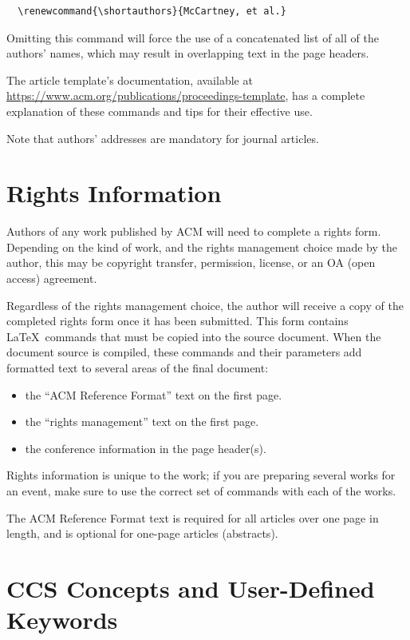 \documentclass[manuscript,screen]{acmart}
\providecommand{\tightlist}{%
  \setlength{\itemsep}{0pt}\setlength{\parskip}{0pt}}\usepackage{longtable,booktabs,array}
\begin{document}
\begin{verbatim}
  \renewcommand{\shortauthors}{McCartney, et al.}
\end{verbatim}

Omitting this command will force the use of a concatenated list of all
of the authors' names, which may result in overlapping text in the page
headers.

The article template's documentation, available at
\url{https://www.acm.org/publications/proceedings-template}, has a
complete explanation of these commands and tips for their effective use.

Note that authors' addresses are mandatory for journal articles.

\hypertarget{rights-information}{%
\section{Rights Information}\label{rights-information}}

Authors of any work published by ACM will need to complete a rights
form. Depending on the kind of work, and the rights management choice
made by the author, this may be copyright transfer, permission, license,
or an OA (open access) agreement.

Regardless of the rights management choice, the author will receive a
copy of the completed rights form once it has been submitted. This form
contains \LaTeX~commands that must be copied into the source document.
When the document source is compiled, these commands and their
parameters add formatted text to several areas of the final document:

\begin{itemize}
\tightlist
\item
  the ``ACM Reference Format'' text on the first page.
\item
  the ``rights management'' text on the first page.
\item
  the conference information in the page header(s).
\end{itemize}

Rights information is unique to the work; if you are preparing several
works for an event, make sure to use the correct set of commands with
each of the works.

The ACM Reference Format text is required for all articles over one page
in length, and is optional for one-page articles (abstracts).

\hypertarget{ccs-concepts-and-user-defined-keywords}{%
\section{CCS Concepts and User-Defined
Keywords}\label{ccs-concepts-and-user-defined-keywords}}
\end{document}
